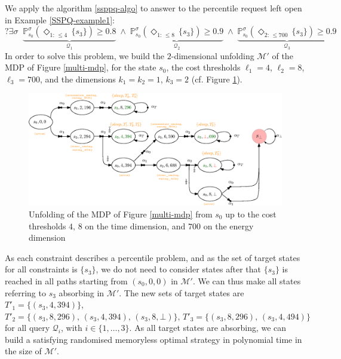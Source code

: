 \begin{example}
  We apply the algorithm \ref{ssppq-algo} to answer to the percentile request left open in Example \ref{SSPQ-example1}:
  \[
  ?\exists \sigma \;\; \underbrace{\mathbb{P}^{\sigma}_{s_0}(\Diamond_{1: \, \leq 4} \, \{s_3\}) \geq 0.8}_{\mathcal{Q}_1} \; \wedge \;
   \underbrace{\mathbb{P}^{\sigma}_{s_0}(\Diamond_{1: \, \leq 8} \, \{s_3\}) \geq 0.9}_{\mathcal{Q}_2} \; \wedge \;
  \underbrace{\mathbb{P}_{s_0}^{\sigma}(\Diamond_{2: \, \leq 700} \, \{s_3\}) \geq 0.9}_{\mathcal{Q}_3}
  \]
  In order to solve this \SSPPQ{} problem, we build the $2$-dimensional unfolding $\mathcal{M'}$ of the MDP of Figure \ref{multi-mdp}, for the state $s_0$, the cost thresholds $\ell_1 = 4$, $\ell_2 = 8$, $\ell_3 = 700$, and the dimensions $k_1 = k_2 = 1$, $k_3 = 2$ (cf. Figure \ref{multi-unfolding}).
  \begin{figure}[h]
    \centering
    \includegraphics[width=\linewidth]{resources/SSP-PQ-unfolding}
    \captionsetup{justification=centering}
    \caption{Unfolding of the MDP of Figure \ref{multi-mdp} from $s_0$ up to the cost thresholds $4, \, 8$ on the time dimension, and $700$ on the energy dimension}
    \label{multi-unfolding}
  \end{figure}
  As each constraint describes a percentile problem,
  and as the set of target states for all constraints is $\{s_3\}$, we do not need to consider states after that $\{s_3\}$ is reached in all paths starting from $(s_0, 0, 0)$ in $\mathcal{M}'$.
  We can thus make all states referring to $s_3$  absorbing in $\mathcal{M}'$.
  The new sets of target states are $T'_1 = \{(s_3, 4, 394)\}$, $T'_2 = \{(s_3, 8, 296), \, (s_3, 4, 394), \, (s_3, 8, \bot)\}, \, T'_3 = \{ (s_3, 8, 296), \, (s_3, 4, 494) \}$
  for all query $\mathcal{Q}_i$, with $i \in \{1, \dots, 3\}$. As all target states are absorbing, we can build a satisfying randomised memoryless optimal strategy in polynomial time in the size of $\mathcal{M}'$.

\end{example}
